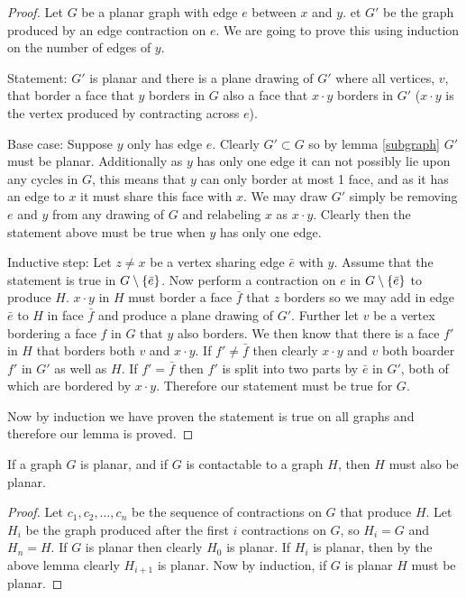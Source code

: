 \documentclass{article}
\begin{document}
\begin{proof}
	Let $G$ be a planar graph with edge $e$ between $x$ and $y$. et $G'$ be the graph produced by an edge contraction on $e$. We are going to prove this using induction on the number of edges of $y$.
	
	Statement: $G'$ is planar and there is a plane drawing of $G'$ where all vertices, $v$, that border a face that $y$ borders in $G$ also a face that $x\cdot y$ borders in $G'$ ($x\cdot y$ is the vertex produced by contracting across $e$).
	
	Base case: Suppose $y$ only has edge $e$. Clearly $G'\subset G$ so by lemma \ref{subgraph} $G'$ must be planar. Additionally as $y$ has only one edge it can not possibly lie upon any cycles in $G$, this means that $y$ can only border at most 1 face, and as it has an edge to $x$ it must share this face with $x$. We may draw $G'$ simply be removing $e$ and $y$ from any drawing of $G$ and relabeling $x$ as $x\cdot y$. Clearly then the statement above must be true when $y$ has only one edge.
	
	Inductive step: Let $z\not=x$ be a vertex sharing edge $\bar e$ with $y$. Assume that the statement is true in $G\setminus\left\{ {\bar e} \right\}$. Now perform a contraction on $e$ in $G\setminus\left\{ {\bar e} \right\}$ to produce $H$. $x\cdot y$ in $H$ must border a face $\bar f$ that $z$ borders so we may add in edge $\bar e$ to $H$ in face $\bar f$ and produce a plane drawing of $G'$. Further let $v$ be a vertex bordering a face $f$ in $G$ that $y$ also borders. We then know that there is a face $f'$ in $H$ that borders both $v$ and $x \cdot y$. If $f'\not=\bar f$ then clearly $x\cdot y$ and $v$ both boarder $f'$ in $G'$ as well as $H$. If $f'=\bar f$ then $f'$ is split into two parts by $\bar e$ in $G'$, both of which are bordered by $x\cdot y$. Therefore our statement must be true for $G$.
	
	Now by induction we have proven the statement is true on all graphs and therefore our lemma is proved.
\end{proof}

\begin{corallary} \label{contractible}
	If a graph $G$ is planar, and if $G$ is contactable to a graph $H$, then $H$ must also be planar.
\end{corallary}

\begin{proof}
	Let $c_1,c_2,\ldots, c_n$ be the sequence of contractions on $G$ that produce $H$. Let $H_i$ be the graph produced after the first $i$ contractions on $G$, so $H_i = G$ and $H_n = H$. If $G$ is planar then clearly $H_0$ is planar. If $H_i$ is planar, then by the above lemma clearly $H_{i+1}$ is planar. Now by induction, if $G$ is planar $H$ must be planar.
\end{proof}
\end{document}
